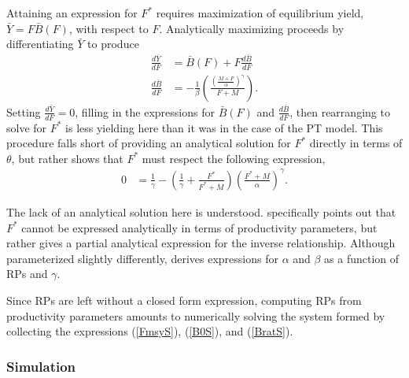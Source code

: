 %
Attaining an expression for $F^*$ requires maximization of equilibrium 
yield, \mbox{$\bar{Y}=F\bar{B}(F)$}, with respect to $F$. Analytically maximizing 
proceeds by differentiating $\bar{Y}$ to produce
%
\begin{align}
\frac{d \bar{Y}}{dF} &= \bar B(F) + F \frac{d \bar B}{dF} \label{FderivS}\\
\frac{d \bar B}{dF} &= -\frac{1}{\beta}  \left(\frac{\left(\frac{M+F}{\alpha}\right)^\gamma}{F+M}\right)\label{dBdFS}.
\end{align}
%
Setting $\frac{d \bar{Y}}{dF}=0$, filling in the expressions for $\bar B(F)$ 
and $\frac{d \bar B}{dF}$, then rearranging to solve for $F^*$ is less 
yielding here than it was in the case of the PT model. This procedure falls 
short of providing an analytical solution for $F^*$ directly in terms of 
$\theta$, %
but rather shows that $F^*$ must respect the following expression,  
%
\begin{align}\label{FmsyS}
0 &= \frac{1}{\gamma} - \left(\frac{1}{\gamma} + \frac{F^*}{F^*+M}\right)\left(\frac{F^*+M}{\alpha}\right)^\gamma.  
\end{align}

The lack of an analytical solution here is understood. 
 specifically points out that 
$F^*$ cannot be expressed analytically in terms of productivity parameters, 
but rather gives a partial analytical expression for the inverse relationship. 
Although parameterized slightly differently,  
derives expressions for $\alpha$ and $\beta$ as a function of RPs and $\gamma$. 

%
Since RPs are left without a closed form expression, computing RPs from 
productivity parameters amounts to numerically solving the system formed by collecting the 
expressions (\ref{FmsyS}), (\ref{B0S}), and (\ref{BratS}).

%
\subsubsection{Simulation \label{sSim}}


